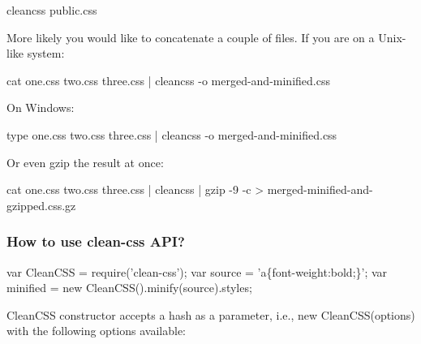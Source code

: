 \begin{DoxyCode}
cleancss public.css
\end{DoxyCode}


More likely you would like to concatenate a couple of files. If you are on a Unix-\/like system\+:


\begin{DoxyCode}
cat one.css two.css three.css | cleancss -o merged-and-minified.css
\end{DoxyCode}


On Windows\+:


\begin{DoxyCode}
type one.css two.css three.css | cleancss -o merged-and-minified.css
\end{DoxyCode}


Or even gzip the result at once\+:


\begin{DoxyCode}
cat one.css two.css three.css | cleancss | gzip -9 -c > merged-minified-and-gzipped.css.gz
\end{DoxyCode}


\subsubsection*{How to use clean-\/css A\+PI?}


\begin{DoxyCode}
var CleanCSS = require('clean-css');
var source = 'a\{font-weight:bold;\}';
var minified = new CleanCSS().minify(source).styles;
\end{DoxyCode}


Clean\+C\+SS constructor accepts a hash as a parameter, i.\+e., {\ttfamily new Clean\+C\+S\+S(options)} with the following options available\+:



